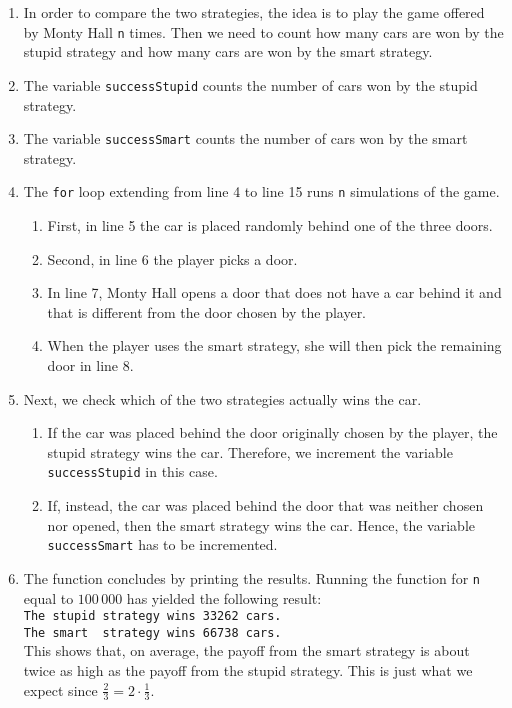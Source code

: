 \begin{enumerate}
\item In order to compare the two strategies, the idea is to play the game offered by Monty Hall
      \texttt{n} times.  Then we need to count how many cars are won by the stupid strategy and how
      many cars are won by the smart strategy.
\item The variable \texttt{successStupid} counts the number of cars won by the stupid strategy.
\item The variable \texttt{successSmart}  counts the number of cars won by the smart  strategy.
\item The \texttt{for} loop extending from line 4 to line 15 runs \texttt{n} simulations of the
       game.
       \begin{enumerate}
       \item First, in line 5 the car is placed randomly behind one of the three doors.
       \item Second, in line 6 the player picks a door.
       \item In line 7, Monty Hall opens a door that does not have a car behind it and that
             is different from the door chosen by the player.
       \item When the player uses the smart strategy, she will then pick the remaining door in line 8.
       \end{enumerate}
\item Next, we check which of the two strategies actually wins the car.
      \begin{enumerate}
      \item If the car was placed behind the door originally chosen by the player, the stupid
            strategy wins the car.  Therefore, we increment the variable \texttt{successStupid} in
            this case.
      \item If, instead, the car was placed behind the door that was neither chosen nor opened, then
            the smart strategy wins the car.  Hence, the variable \texttt{successSmart} has to be incremented.
      \end{enumerate}
\item The function concludes by printing the results.  Running the function for \texttt{n} equal to
      $100\,000$ has yielded the following result:
      \\[0.2cm]
      \hspace*{1.3cm}
      \texttt{The stupid strategy wins 33262 cars.} \\ 
      \hspace*{1.3cm}
      \texttt{The smart \ strategy wins 66738 cars.}
      \\[0.2cm]
      This shows that, on average, the payoff from the smart strategy is about twice as high as the
      payoff from the stupid strategy.  This is just what we expect since $\frac{2}{3} = 2 \cdot \frac{1}{3}$.
\end{enumerate}


